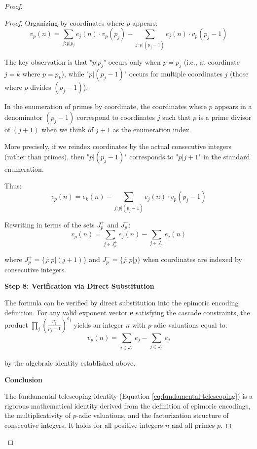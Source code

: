 \begin{proof}
\begin{proof}
Organizing by coordinates where $p$ appears:
\begin{equation}
v_p(n) = \sum_{j: p|p_j} e_j(n) \cdot v_p(p_j) - \sum_{j: p|(p_j - 1)} e_j(n) \cdot v_p(p_j - 1)
\end{equation}

The key observation is that "$p | p_j$" occurs only when $p = p_j$ (i.e., at coordinate $j = k$ where $p = p_k$), while "$p | (p_j - 1)$" occurs for multiple coordinates $j$ (those where $p$ divides $(p_j - 1)$).

In the enumeration of primes by coordinate, the coordinates where $p$ appears in a denominator $(p_j - 1)$ correspond to coordinates $j$ such that $p$ is a prime divisor of $(j+1)$ when we think of $j+1$ as the enumeration index.

More precisely, if we reindex coordinates by the actual consecutive integers (rather than primes), then "$p | (p_j - 1)$" corresponds to "$p | j+1$" in the standard enumeration.

Thus:
\begin{equation}
v_p(n) = e_k(n) - \sum_{j: p|(p_j - 1)} e_j(n) \cdot v_p(p_j - 1)
\end{equation}

Rewriting in terms of the sets $J_p^+$ and $J_p^-$:
\begin{equation}
v_p(n) = \sum_{j \in J_p^+} e_j(n) - \sum_{j \in J_p^-} e_j(n)
\end{equation}

where $J_p^+ = \{j : p | (j+1)\}$ and $J_p^- = \{j : p | j\}$ when coordinates are indexed by consecutive integers.

\noindent \textbf{Step 8: Verification via Direct Substitution}

The formula can be verified by direct substitution into the epimoric encoding definition. For any valid exponent vector $\mathbf{e}$ satisfying the cascade constraints, the product $\prod_j \left(\frac{p_j}{p_j - 1}\right)^{e_j}$ yields an integer $n$ with $p$-adic valuations equal to:
\begin{equation}
v_p(n) = \sum_{j \in J_p^+} e_j - \sum_{j \in J_p^-} e_j
\end{equation}

by the algebraic identity established above.

\noindent \textbf{Conclusion}

The fundamental telescoping identity (Equation \ref{eq:fundamental-telescoping}) is a rigorous mathematical identity derived from the definition of epimoric encodings, the multiplicativity of $p$-adic valuations, and the factorization structure of consecutive integers. It holds for all positive integers $n$ and all primes $p$.


\end{proof}
\end{proof}
